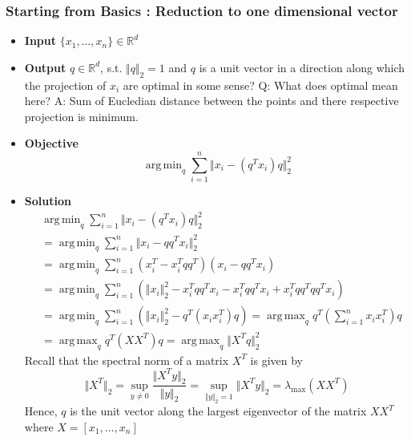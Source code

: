 \documentclass{article}
\DeclareMathOperator*{\argmax}{arg\,max}
\DeclareMathOperator*{\argmin}{arg\,min}
\begin{document}
\subsubsection{Starting from Basics : Reduction to one dimensional vector}
\begin{itemize}
    \item \textbf{Input} $\{x_1, \dots, x_n\} \in \mathbb{R}^d$
    \item \textbf{Output} $q \in \mathbb{R}^d$, s.t. $\Vert q \Vert_2=1$ and $q$ is a unit vector in a direction along which the projection of $x_i$ are optimal in some sense? Q: What does optimal mean here? A: Sum of Eucledian distance between the points and there respective projection is minimum.
    \item \textbf{Objective} 
        $$\argmin_{q} \sum_{i=1}^n \Vert x_i - (q^Tx_i)q \Vert_2^2  $$
    \item \textbf{Solution} 
        \begin{align*}
            & \argmin_{q} \sum_{i=1}^n \Vert x_i - (q^Tx_i)q \Vert_2^2 \\
            &= \argmin_{q} \sum_{i=1}^n \Vert x_i - qq^Tx_i \Vert_2^2 \\
            &= \argmin_{q} \sum_{i=1}^n (x_i^T - x_i^Tqq^T)(x_i - qq^Tx_i) \\
            &= \argmin_{q} \sum_{i=1}^n \left( \Vert x_i \Vert_2^2 - x_i^Tqq^Tx_i - x_i^Tqq^Tx_i + x_i^Tqq^Tqq^Tx_i \right)\\
            &= \argmin_{q} \sum_{i=1}^n \left( \Vert x_i \Vert_2^2 - q^T(x_ix_i^T)q \right)
            = \argmax_{q} q^T( \sum_{i=1}^n x_ix_i^T)q\\
            &= \argmax_{q} q^T( XX^T )q = \argmax_{q} \Vert X^Tq \Vert_2^2
        \end{align*}
        Recall that the spectral norm of a matrix $X^T$ is given by
        $$\Vert X^T\Vert_2 = \sup_{y \neq 0} \frac{\Vert X^Ty \Vert_2}{\Vert y \Vert_2} = \sup_{\Vert y \Vert_2 = 1} \Vert X^Ty \Vert_2 = \lambda_{\text{max}}(XX^T)$$
        Hence, $q$ is the unit vector along the largest eigenvector of the matrix $XX^T$ where $X = [x_1, \dots, x_n]$
\end{itemize}
\end{document}
